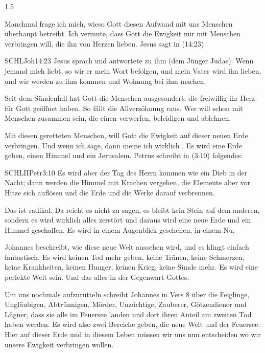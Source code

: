 \documentclass[fontsize=14pt]{../../inc/mybib}
\begin{document}
\begin{spacing}{1.5}
\begin{block}
        Manchmal frage ich mich, wieso Gott diesen Aufwand mit uns Menschen überhaupt betreibt. Ich vermute, dass Gott die Ewigkeit nur mit Menschen verbringen will, die ihn von Herzen lieben. Jesus sagt in (14:23)
        \begin{bibelbox}{SCHL}{Joh}{14:23}
            Jesus sprach und antwortete zu ihm (dem Jünger Judas): Wenn jemand mich liebt, so wir er mein Wort befolgen, und mein Vater wird ihn lieben, und wir werden zu ihm kommen und Wohnung bei ihm machen.
        \end{bibelbox}        
        Seit dem Sündenfall hat Gott die Menschen ausgesondert, die freiwillig ihr Herz für Gott geöffnet haben. So fällt die Allversöhnung raus. Wer will schon mit Menschen zusammen sein, die einen verwerfen, beleidigen und ablehnen.

        Mit diesen geretteten Menschen, will Gott die Ewigkeit auf dieser neuen Erde verbringen. Und wenn ich  sage, dann meine ich wirklich . Es wird eine  Erde geben, einen  Himmel und ein  Jerusalem. Petrus schreibt in (3:10) folgendes:
        \begin{bibelbox}{SCHL}{IIPetr}{3:10}
           Es wird aber der Tag des Herrn kommen wie ein Dieb in der Nacht; dann werden die Himmel mit Krachen vergehen, die Elemente aber vor Hitze sich auflösen und die Erde und die Werke darauf verbrennen.
        \end{bibelbox}
        Das ist radikal. Da reicht es nicht zu sagen, es bleibt kein Stein auf dem anderen, sondern es wird wirklich alles zerstört und daraus wird eine neue Erde und ein Himmel geschaffen. Es wird in einem Augenblick geschehen, in einem Nu. 

        Johannes beschreibt, wie diese neue Welt aussehen wird, und es klingt einfach fantastisch. Es wird keinen Tod mehr geben, keine Tränen, keine Schmerzen, keine Krankheiten, keinen Hunger, keinen Krieg, keine Sünde mehr. Es wird eine perfekte Welt sein. Und das alles in der Gegenwart Gottes. 

        Um uns nochmals aufzurütteln schreibt Johannes in Vers 8 über die Feiglinge, Ungläubigen, Abtrünnigen, Mörder, Unzüchtige, Zauberer, Götzendiener und Lügner, dass sie alle im Feuersee landen und dort ihren Anteil am zweiten Tod haben werden. Es wird also zwei Bereiche geben, die neue Welt und der Feuersee. Hier auf dieser Erde und in diesem Leben müssen wir uns nun entscheiden wo wir unsere Ewigkeit verbringen wollen.


\end{block}
\end{spacing}
\end{document}
